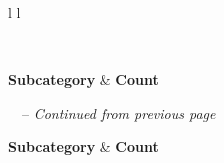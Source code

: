\documentclass[10pt]{article}
\begin{document}
\begin{centering}


\begin{longtable}{ l l }

\caption{Subcategory counts}\\

\hline
\hline

\textbf{Subcategory} & \textbf{Count} \\

\hline
\hline

\endfirsthead


{\tablename\ \thetable\ -- \textit{Continued from previous page}} \\

\hline
\hline

\textbf{Subcategory} & \textbf{Count} \\

\hline
\hline

\endhead

\hline {} \\

\endfoot

\hline
\hline

\endlastfoot

\hline


\end{longtable}
\end{centering}
\end{document}
